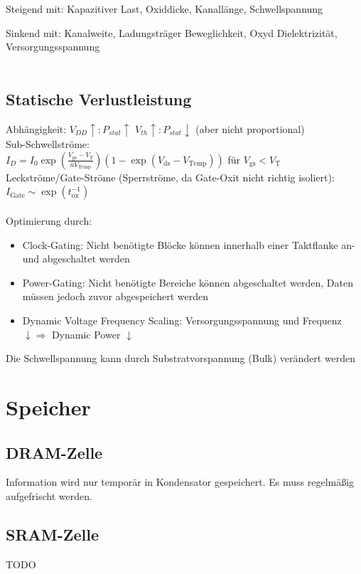 \documentclass[english]{latex4ei/latex4ei_sheet}
\begin{document}
Steigend mit: Kapazitiver Last, Oxiddicke, Kanallänge, Schwellspannung

Sinkend mit: Kanalweite, Ladungsträger Beweglichkeit, Oxyd Dielektrizität, Versorgungsspannung \\ \\
\subsection{Statische Verlustleistung}
Abhängigkeit: $V_{DD}\uparrow:P_{stat}\uparrow$ \qquad $V_{th}\uparrow:P_{stat}\downarrow$ \quad (aber nicht proportional)\\
Sub-Schwellströme:\\
$I_D= I_0 \exp\left(\frac{V_{\text{gs}}-V_T}{nV_{\text{Temp}}}\right) \left(1-\exp\left(V_{\text{ds}}-V_{\text{Temp}}\right)\right)$ für $V_{\text{gs}} < V_{\text{T}}$\\
Leckströme/Gate-Ströme (Sperrströme, da Gate-Oxit nicht richtig isoliert):\\
$I_{\text{Gate}} \sim \exp\left(t_{\text{ox}}^{-1}\right)$\\
\\
Optimierung durch:
\begin{itemize}
    \item Clock-Gating: Nicht benötigte Blöcke können innerhalb einer Taktflanke an- und abgeschaltet werden
    \item Power-Gating: Nicht benötigte Bereiche können abgeschaltet werden, Daten müssen jedoch zuvor abgespeichert werden
    \item Dynamic Voltage Frequency Scaling: Versorgungsspannung und Frequenz $\downarrow \Rightarrow$ Dynamic Power $\downarrow$
\end{itemize}

Die Schwellspannung kann durch Substratvorspannung (Bulk) verändert werden

\section{Speicher}
\subsection{DRAM-Zelle}
Information wird nur temporär in Kondensator gespeichert. Es muss regelmäßig aufgefrischt werden.
\subsection{SRAM-Zelle}
TODO
\end{document}
